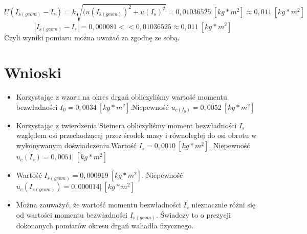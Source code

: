 \documentclass[]{article}
\begin{document}
\[
U(I_{s(geom)} - I_{s}) = k \sqrt{(u(I_{s(geom)})^2 + u( I_{s})^2}
= 0,01036525\:[kg*m^2] \approx 0,011\:[kg*m^2]
\]
\[
|I_{s(geom)} - I_{s}| = 0,000081 << 0,01036525 \approx 0,011\:[kg*m^2]
\]
Czyli wyniki pomiaru można uważać za zgodnę ze sobą.









\section{Wnioski}
\begin{itemize}
        \item Korzystając z wzoru na okres drgań obliczyliśmy wartość momentu bezwładności \(I_{0}=0,0034\:[kg*m^2]\).\newline Niepewność \(u_{c(I_{0})}=0,0052\:[kg*m^2]\)
        
		\item Korzystając z twierdzenia Steinera obliczyliśmy moment bezwładności \(I_{s}\) względem osi przechodzącej przez środek masy i równoległej do osi obrotu w wykonywanym doświadczeniu.\newline Wartość \(I_{s}= 0,0010\: [kg*m^2]\). Niepewność \(u_c(I_{s})=0,0051|\:[kg*m^2]\)
		\item  Wartość \(I_{s(geom)}= 0,000919\: [kg*m^2]\). Niepewność \(u_c(I_{s(geom)})=0,000014|\:[kg*m^2]\)
		\item  Można zauważyć, że wartość momentu bezwładności \(I_{s}\) nieznacznie różni się od wartości momentu bezwładności \(I_{s(geom)}\). Świadczy to o prezycji dokonanych pomiarów okresu drgań wahadła fizycznego.
	\end{itemize}
\end{document}
